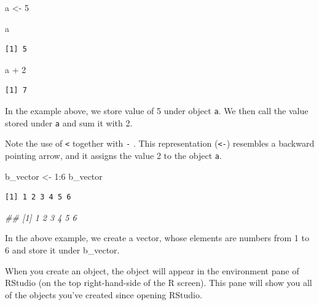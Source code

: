 \documentclass[
  letterpaper,
  DIV=11,
  numbers=noendperiod]{scrreprt}
\newenvironment{Shaded}{\begin{snugshade}}{\end{snugshade}}
\newcommand{\DecValTok}[1]{\textcolor[rgb]{0.68,0.00,0.00}{#1}}
\newcommand{\DocumentationTok}[1]{\textcolor[rgb]{0.37,0.37,0.37}{\textit{#1}}}
\newcommand{\NormalTok}[1]{\textcolor[rgb]{0.00,0.23,0.31}{#1}}
\newcommand{\OtherTok}[1]{\textcolor[rgb]{0.00,0.23,0.31}{#1}}
\newcommand{\SpecialCharTok}[1]{\textcolor[rgb]{0.37,0.37,0.37}{#1}}
\begin{document}
\begin{Shaded}
\begin{Highlighting}[]
\NormalTok{a }\OtherTok{\textless{}{-}} \DecValTok{5}

\NormalTok{a}
\end{Highlighting}
\end{Shaded}

\begin{verbatim}
[1] 5
\end{verbatim}

\begin{Shaded}
\begin{Highlighting}[]
\NormalTok{a }\SpecialCharTok{+} \DecValTok{2}
\end{Highlighting}
\end{Shaded}

\begin{verbatim}
[1] 7
\end{verbatim}

In the example above, we store value of 5 under object \texttt{a}. We
then call the value stored under \texttt{a} and sum it with 2.

Note the use of \texttt{\textless{}} together with \texttt{-} . This
representation (\texttt{\textless{}-}) resembles a backward pointing
arrow, and it assigns the value 2 to the object \texttt{a}.

\begin{Shaded}
\begin{Highlighting}[]
\NormalTok{b\_vector }\OtherTok{\textless{}{-}} \DecValTok{1}\SpecialCharTok{:}\DecValTok{6}
\NormalTok{b\_vector}
\end{Highlighting}
\end{Shaded}

\begin{verbatim}
[1] 1 2 3 4 5 6
\end{verbatim}

\begin{Shaded}
\begin{Highlighting}[]
\DocumentationTok{\#\# [1] 1 2 3 4 5 6}
\end{Highlighting}
\end{Shaded}

In the above example, we create a vector, whose elements are numbers
from 1 to 6 and store it under b\_vector.

When you create an object, the object will appear in the environment
pane of RStudio (on the top right-hand-side of the R screen). This pane
will show you all of the objects you've created since opening RStudio.
\end{document}
